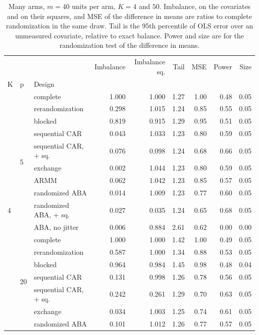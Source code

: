 \begin{table}[t]
\centering
\caption{Many arms, $m = 40$ units per arm, $K = 4$ and $50$. Imbalance, on the covariates and on their squares, and MSE of the difference in means are ratios to complete randomization in the same draw. Tail is the 95th percentile of OLS error over an unmeasured covariate, relative to exact balance. Power and size are for the randomization test of the difference in means.}
\label{tab:many}
\begin{tabular}{lllrrrrrr}
\toprule
 &  &  & Imbalance & Imbalance sq. & Tail & MSE & Power & Size \\
K & p & Design &  &  &  &  &  &  \\
\midrule
\multirow[t]{19}{*}{4} & \multirow[t]{10}{*}{5} & complete & 1.000 & 1.000 & 1.27 & 1.00 & 0.48 & 0.05 \\
 &  & rerandomization & 0.298 & 1.015 & 1.24 & 0.85 & 0.55 & 0.05 \\
 &  & blocked & 0.819 & 0.915 & 1.29 & 0.95 & 0.51 & 0.05 \\
 &  & sequential CAR & 0.043 & 1.033 & 1.23 & 0.80 & 0.59 & 0.05 \\
 &  & sequential CAR, + sq. & 0.076 & 0.098 & 1.24 & 0.68 & 0.66 & 0.05 \\
 &  & exchange & 0.002 & 1.044 & 1.23 & 0.80 & 0.59 & 0.05 \\
 &  & ARMM & 0.062 & 1.042 & 1.23 & 0.85 & 0.57 & 0.05 \\
 &  & randomized ABA & 0.014 & 1.009 & 1.23 & 0.77 & 0.60 & 0.05 \\
 &  & randomized ABA, + sq. & 0.027 & 0.035 & 1.24 & 0.65 & 0.68 & 0.05 \\
 &  & ABA, no jitter & 0.006 & 0.884 & 2.61 & 0.62 & 0.00 & 0.00 \\
\cline{2-9}
 & \multirow[t]{9}{*}{20} & complete & 1.000 & 1.000 & 1.42 & 1.00 & 0.49 & 0.05 \\
 &  & rerandomization & 0.587 & 1.000 & 1.34 & 0.88 & 0.53 & 0.05 \\
 &  & blocked & 0.964 & 0.984 & 1.45 & 0.98 & 0.48 & 0.04 \\
 &  & sequential CAR & 0.131 & 0.998 & 1.26 & 0.78 & 0.56 & 0.05 \\
 &  & sequential CAR, + sq. & 0.242 & 0.261 & 1.29 & 0.70 & 0.63 & 0.05 \\
 &  & exchange & 0.034 & 1.003 & 1.25 & 0.74 & 0.61 & 0.05 \\
 &  & randomized ABA & 0.101 & 1.012 & 1.26 & 0.77 & 0.57 & 0.05 \\

\end{tabular}
\end{table}
